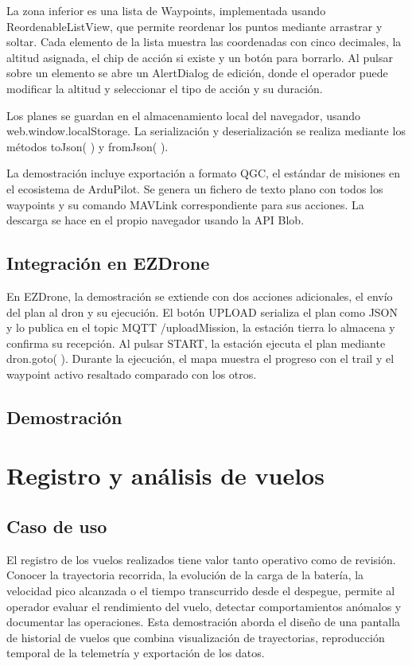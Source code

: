La zona inferior es una lista de Waypoints, implementada usando ReordenableListView, que permite reordenar los puntos mediante arrastrar y soltar. Cada elemento de la lista muestra las coordenadas con cinco decimales, la altitud asignada, el chip de acción si existe y un botón para borrarlo. Al pulsar sobre un elemento se abre un AlertDialog de edición, donde el operador puede modificar la altitud y seleccionar el tipo de acción y su duración.

Los planes se guardan en el almacenamiento local del navegador, usando web.window.localStorage. La serialización y deserialización se realiza mediante los métodos toJson( ) y fromJson( ). 

La demostración incluye exportación a formato QGC, el estándar de misiones en el ecosistema de ArduPilot. Se genera un fichero de texto plano con todos los waypoints y su comando MAVLink correspondiente para sus acciones. La descarga se hace en el propio navegador usando la API Blob.

\subsection{Integración en EZDrone}
En EZDrone, la demostración se extiende con dos acciones adicionales, el envío del plan al dron y su ejecución. El botón UPLOAD serializa el plan como JSON y lo publica en el topic MQTT /uploadMission, la estación tierra lo almacena y confirma su recepción. Al pulsar START, la estación ejecuta el plan mediante dron.goto( ). Durante la ejecución, el mapa muestra el progreso con el trail y el waypoint activo resaltado comparado con los otros.

\subsection{Demostración}

\section{Registro y análisis de vuelos}

\subsection{Caso de uso}
El registro de los vuelos realizados tiene valor tanto operativo como de revisión. Conocer la trayectoria recorrida, la evolución de la carga de la batería, la velocidad pico alcanzada o el tiempo transcurrido desde el despegue, permite al operador evaluar el rendimiento del vuelo, detectar comportamientos anómalos y documentar las operaciones. Esta demostración aborda el diseño de una pantalla de historial de vuelos que combina visualización de trayectorias, reproducción temporal de la telemetría y exportación de los datos.

